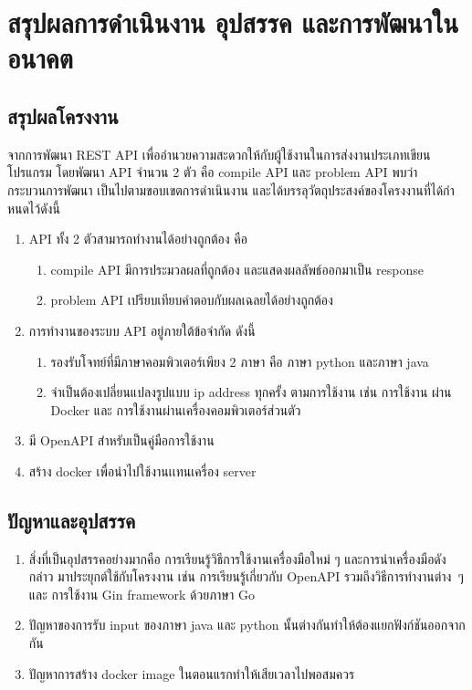 \chapter{สรุปผลการดำเนินงาน อุปสรรค และการพัฒนาในอนาคต}
\label{chapter5}

\section{สรุปผลโครงงาน}
จากการพัฒนา REST API เพื่ออํานวยความสะดวกให้กับผู้ใช้งานในการส่งงานประเภทเขียน
โปรแกรม โดยพัฒนา API จํานวน 2 ตัว คือ compile API และ problem API พบว่ากระบวนการพัฒนา
เป็นไปตามขอบเขตการดําเนินงาน และได้บรรลุวัตถุประสงค์ของโครงงานที่ได้\mbox{กําหนด}ไว้ดังนี้
\begin{enumerate}
    \item API ทั้ง 2 ตัวสามารถทํางานได้อย่างถูกต้อง คือ
        \begin{enumerate}
            \item compile API มีการประมวลผลที่ถูกต้อง และแสดงผลลัพธ์ออกมาเป็น response
            \item problem API เปรียบเทียบคําตอบกับผลเฉลยได้อย่างถูกต้อง
        \end{enumerate}
    
    \item การทํางานของระบบ API อยู่ภายใต้ข้อจํากัด ดังนี้
        \begin{enumerate}
            \item รองรับโจทย์ที่มีภาษาคอมพิวเตอร์เพียง 2 ภาษา คือ ภาษา python และภาษา java
            \item จําเป็นต้องเปลี่ยนแปลงรูปแบบ ip address ทุกครั้ง ตามการใช้งาน เช่น การใช้งาน
ผ่าน Docker และ การใช้งานผ่านเครื่องคอมพิวเตอร์ส่วนตัว
        \end{enumerate}

    \item มี OpenAPI สำหรับเป็นคู่มือการใช้งาน
    \item สร้าง docker เพื่อนำไปใช้งานเเทนเครื่อง server
\end{enumerate}
    
\section{ปัญหาและอุปสรรค}
    \begin{enumerate}
        \item สิ่งที่เป็นอุปสรรคอย่างมากคือ การเรียนรู้วิธีการใช้งานเครื่องมือใหม่ ๆ และการนําเครื่องมือดังกล่าว มาประยุกต์ใช้กับโครงงาน เช่น การเรียนรู้เกี่ยวกับ OpenAPI รวมถึงวิธีการทํางาน\mbox{ต่าง ๆ} และ การใช้งาน Gin framework ด้วยภาษา Go 
        \item ปัญหาของการรับ input ของภาษา java และ python นั้นต่างกันทำให้ต้องแยกฟังก์ชันออกจากกัน
        \item ปัญหาการสร้าง docker image ในตอนแรกทำให้เสียเวลาไปพอสมควร
    \end{enumerate}
